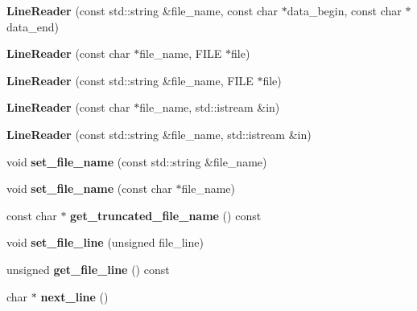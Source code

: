 \begin{DoxyCompactItemize}
\item 
\mbox{\label{classio_1_1LineReader_a0a52d864b46442a253443cac1367366e}} 
{\bfseries Line\+Reader} (const std\+::string \&file\+\_\+name, const char $\ast$data\+\_\+begin, const char $\ast$data\+\_\+end)
\item 
\mbox{\label{classio_1_1LineReader_ad2a8943ba0848ae5052e2f5ad30c010e}} 
{\bfseries Line\+Reader} (const char $\ast$file\+\_\+name, F\+I\+LE $\ast$file)
\item 
\mbox{\label{classio_1_1LineReader_a93fa2e3ae98b0e7a7391714d6395c552}} 
{\bfseries Line\+Reader} (const std\+::string \&file\+\_\+name, F\+I\+LE $\ast$file)
\item 
\mbox{\label{classio_1_1LineReader_a301c08eb9ca5d3fdccf4e9a8e5ac82f8}} 
{\bfseries Line\+Reader} (const char $\ast$file\+\_\+name, std\+::istream \&in)
\item 
\mbox{\label{classio_1_1LineReader_a3eacf4d1539a24122c6897fce4e72f06}} 
{\bfseries Line\+Reader} (const std\+::string \&file\+\_\+name, std\+::istream \&in)
\item 
\mbox{\label{classio_1_1LineReader_a1a0763d491dec16cebc33134e965dfee}} 
void {\bfseries set\+\_\+file\+\_\+name} (const std\+::string \&file\+\_\+name)
\item 
\mbox{\label{classio_1_1LineReader_a81c56ac68497da5ec874333ce063fd83}} 
void {\bfseries set\+\_\+file\+\_\+name} (const char $\ast$file\+\_\+name)
\item 
\mbox{\label{classio_1_1LineReader_ad5817da6af1ae77daddec7aeaeebf2f8}} 
const char $\ast$ {\bfseries get\+\_\+truncated\+\_\+file\+\_\+name} () const
\item 
\mbox{\label{classio_1_1LineReader_a581b55d4ced6adb964de50fa8ac6eb08}} 
void {\bfseries set\+\_\+file\+\_\+line} (unsigned file\+\_\+line)
\item 
\mbox{\label{classio_1_1LineReader_a3f3459e22ed8e459238c290050b6722e}} 
unsigned {\bfseries get\+\_\+file\+\_\+line} () const
\item 
\mbox{\label{classio_1_1LineReader_a97f4e0129611d9da2b8c966ffe670be5}} 
char $\ast$ {\bfseries next\+\_\+line} ()
\end{DoxyCompactItemize}
